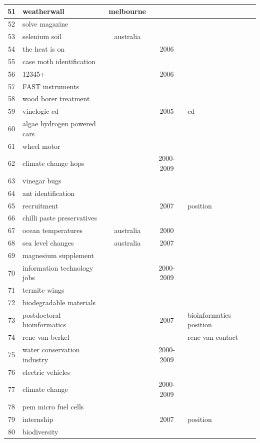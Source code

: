 \begin{center}
\begin{longtable}{c|p{3cm}|c|c|p{3cm}}
51 & weatherwall & melbourne &  &  \\ \hline
52 & solve magazine &  &  &  \\ \hline
53 & selenium soil & australia &  &  \\ \hline
54 & the heat is on &  & 2006 &  \\ \hline
55 & case moth identification &  &  &  \\ \hline
56 & 12345+ &  & 2006 &  \\ \hline
57 & FAST instruments &  &  &  \\ \hline
58 & wood borer treatment &  &  &  \\ \hline
59 & vinelogic cd &  & 2005 & \sout{cd} \\ \hline
60 & algae hydrogen powered cars &  &  &  \\ \hline
61 & wheel motor &  &  &  \\ \hline
62 & climate change hops &  & 2000-2009 &  \\ \hline
63 & vinegar bugs &  &  &  \\ \hline
64 & ant identification &  &  &  \\ \hline
65 & recruitment &  & 2007 & position \\ \hline
66 & chilli paste preservatives &  &  &  \\ \hline
67 & ocean temperatures & australia & 2000 &  \\ \hline
68 & sea level changes & australia & 2007 &  \\ \hline
69 & magnesium supplement &  &  &  \\ \hline
70 & information technology jobs &  & 2000-2009 &  \\ \hline
71 & termite wings &  &  &  \\ \hline
72 & biodegradable materials &  &  &  \\ \hline
73 & postdoctoral bioinformatics &  & 2007 & \sout{bioinformatics} position \\ \hline
74 & rene van berkel &  &  & \sout{rene van} contact \\ \hline
75 & water conservation industry &  & 2000-2009 &  \\ \hline
76 & electric vehicles &  &  &  \\ \hline
77 & climate change &  & 2000-2009 &  \\ \hline
78 & pem micro fuel cells &  &  &  \\ \hline
79 & internship &  & 2007 & position \\ \hline
80 & biodiversity &  &  &  \\ \hline

\end{longtable}
\end{center}

